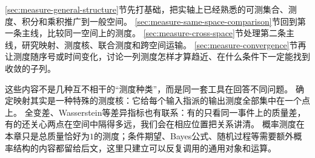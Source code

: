 \ref{sec:measure-general-structure}节先打基础，把实轴上已经熟悉的可测集合、测度、积分和乘积推广到一般空间。
\ref{sec:measure-same-space-comparison}节回到第一条主线，比较同一空间上的测度。
\ref{sec:measure-cross-space}节处理第二条主线，研究映射、测度核、联合测度和跨空间运输。
\ref{sec:measure-convergence}节再让测度随序号或时间变化，讨论一列测度怎样才算趋近、在什么条件下一定能找到收敛的子列。

这些内容不是几种互不相干的“测度种类”，而是同一套工具在回答不同问题。
确定映射其实是一种特殊的测度核：它给每个输入指派的输出测度全部集中在一个点上。
全变差、Wasserstein等差异指标也有联系：有的只看同一事件上的质量差，有的还关心两点在空间中隔得多远，我们会在相应位置把关系讲清。
概率测度在本章只是总质量恰好为$1$的测度；条件期望、Bayes公式、随机过程等需要额外概率结构的内容都留给后文，这里只建立可以反复调用的通用对象和运算。






\FloatBarrier

